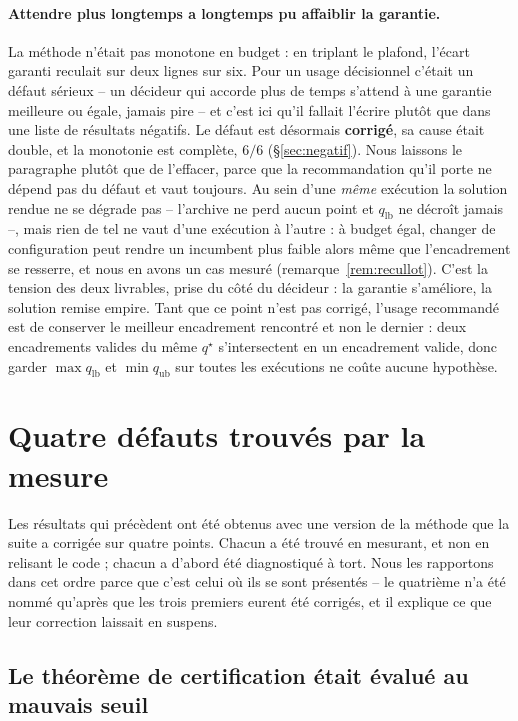 \documentclass[11pt,a4paper]{article}
\theoremstyle{plain}
\theoremstyle{remark}
\newcommand{\qs}{q^{\star}}
\begin{document}
\paragraph{Attendre plus longtemps a longtemps pu affaiblir la garantie.}
La méthode n'était pas monotone en budget : en triplant le plafond, l'écart
garanti reculait sur deux lignes sur six. Pour un usage décisionnel c'était
un défaut sérieux -- un décideur qui accorde plus de temps s'attend à une
garantie meilleure ou égale, jamais pire -- et c'est ici qu'il fallait
l'écrire plutôt que dans une liste de résultats négatifs. Le défaut est
désormais \textbf{corrigé}, sa cause était double, et la monotonie est
complète, $6/6$ (\S\ref{sec:negatif}). Nous laissons le paragraphe plutôt
que de l'effacer, parce que la recommandation qu'il porte ne dépend pas du
défaut et vaut toujours. Au sein d'une
\emph{même} exécution la solution rendue ne se dégrade pas -- l'archive ne
perd aucun point et $q_{\text{lb}}$ ne décroît jamais --, mais rien de tel
ne vaut d'une exécution à l'autre : à budget égal, changer de configuration
peut rendre un incumbent plus faible alors même que l'encadrement se
resserre, et nous en avons un cas mesuré (remarque~\ref{rem:recullot}).
C'est la tension des deux livrables, prise du côté du décideur : la
garantie s'améliore, la solution remise empire. Tant que ce point n'est pas corrigé, l'usage recommandé est de conserver le meilleur encadrement rencontré et non le dernier : deux encadrements valides du même $\qs$ s'intersectent en un encadrement valide, donc garder $\max q_{\text{lb}}$ et $\min q_{\text{ub}}$ sur toutes les exécutions ne coûte aucune hypothèse.

\section{Quatre défauts trouvés par la mesure}
\label{sec:defauts}

Les résultats qui précèdent ont été obtenus avec une version de la méthode
que la suite a corrigée sur quatre points. Chacun a été trouvé en mesurant,
et non en relisant le code ; chacun a d'abord été diagnostiqué à tort. Nous
les rapportons dans cet ordre parce que c'est celui où ils se sont
présentés -- le quatrième n'a été nommé qu'après que les trois premiers
eurent été corrigés, et il explique ce que leur correction laissait en
suspens.

\subsection{Le théorème de certification était évalué au mauvais seuil}
\end{document}
